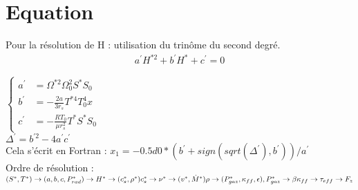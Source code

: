 \section{Equation}
Pour la résolution de H : utilisation du trinôme du second degré.
\begin{eqnarray}
  a^{\prime} H^{* 2}+b^{\prime}H^{*}+c^{\prime}=0
  \end{eqnarray}

  $\begin{cases}  
    a^{\prime} &= \Omega^{*2} \Omega_{0}^{2} S^{*} S_{0}\\
      b^{\prime} &= - \frac{2 a}{3 r_{s}} T^{*4} T_{0}^{4} x \\
        c^{\prime}&=-\frac{RT_{0}}{\mu r_{s}^{2}} T^{*} S^{*} S_{0}
        \end{cases}$\\

        $\Delta^{\prime} = b^{\prime 2} - 4a^{\prime}c^{\prime}$\\

        Cela s'écrit en Fortran : $x_1 = -0.5d0 * (b^{\prime} + sign(sqrt(\Delta^{\prime}),b^{\prime}))/a^{\prime}$\\

        Ordre de résolution : \\


        \noindent $(S^{*},T^{*}) \rightarrow (a, b, c, P_{rad}^{*}) \rightarrow H^{*}
        \rightarrow (c_{s}^{*}, \rho^{*}) \\
        c_{s}^{*} \rightarrow \nu^{*} \rightarrow (v^{*}, \dot{M}^{*}) \\
        \rho \rightarrow (P_{gaz}^{*}, \kappa_{ff}, \epsilon) , \\
        P_{gaz}^{*} \rightarrow \beta \\
        \kappa_{ff} \rightarrow \tau_{eff} \rightarrow F_{z} $
